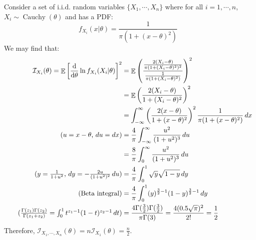 \documentclass{huhtakm-template-book-v2}
\DeclareMathOperator{\E}{\mathbb{E}}
\DeclareMathOperator{\Cauchy}{Cauchy}
\begin{document}
\begin{eg}
	Consider a set of i.i.d. random variables $\{X_{1},\cdots,X_{n}\}$ where for all $i=1,\cdots,n$, $X_{i}\sim\Cauchy(\theta)$ and has a PDF:
	\begin{equation*}
		f_{X_{i}}(x|\theta)=\frac{1}{\pi(1+(x-\theta)^{2})}
	\end{equation*}
	We may find that:
	\begin{align*}
		\mathcal{I}_{X_{i}}(\theta)=\E\left[\odv*{}{\theta}\ln{f_{X_{i}}(X_{i}|\theta)}\right]^{2}&=\E\left(\frac{\frac{2(X_{i}-\theta)}{\pi(1+(X_{i}-\theta)^{2})^{2}}}{\frac{1}{\pi(1+(X_{i}-\theta)^{2})}}\right)^{2}\\
		&=\E\left(\frac{2(X_{i}-\theta)}{1+(X_{i}-\theta)^{2}}\right)^{2}\\
		&=\intinfty\left(\frac{2(x-\theta)}{1+(x-\theta)^{2}}\right)^{2}\frac{1}{\pi(1+(x-\theta)^{2})}\,dx\\
		\tag{$u=x-\theta$, $du=dx$}
		&=\frac{4}{\pi}\intinfty\frac{u^{2}}{(1+u^{2})^{3}}\,du\\
		&=\frac{8}{\pi}\int_{0}^{\infty}\frac{u^{2}}{(1+u^{2})^{3}}\,du\\
		\tag{$y=\frac{1}{1+u^{2}}$, $dy=-\frac{2u}{(1+u^{2})^{2}}\,du$}
		&=\frac{4}{\pi}\int_{0}^{1}\sqrt{y}\sqrt{1-y}\,dy\\
		\tag{Beta integral}
		&=\frac{4}{\pi}\int_{0}^{1}(y)^{\frac{3}{2}-1}(1-y)^{\frac{3}{2}-1}\,dy\\
		\tag{$\frac{\Gamma(z_{1})\Gamma(z_{2})}{\Gamma(z_{1}+z_{2})}=\int_{0}^{1}t^{z_{1}-1}(1-t)^{z_{2}-1}\,dt$}
		&=\frac{4\Gamma(\frac{3}{2})\Gamma(\frac{3}{2})}{\pi\Gamma(3)}=\frac{4(0.5\sqrt{\pi})^{2}}{2!}=\frac{1}{2}
	\end{align*}
	Therefore, $\mathcal{I}_{X_{1},\cdots,X_{n}}(\theta)=n\mathcal{I}_{X_{1}}(\theta)=\frac{n}{2}$.
\end{eg}
\end{document}
